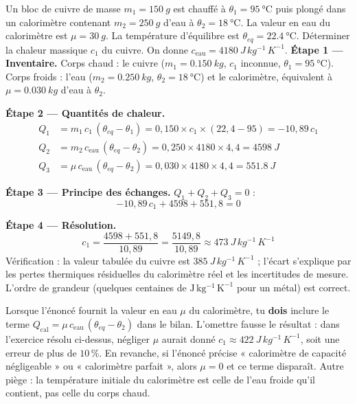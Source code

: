 \documentclass[11pt]{article}
\begin{document}
\begin{exoresolu}
Un bloc de cuivre de masse $m_1 = \SI{150}{g}$ est chauffé à $\theta_1 = \SI{95}{\celsius}$ puis plongé dans un calorimètre contenant $m_2 = \SI{250}{g}$ d'eau à $\theta_2 = \SI{18}{\celsius}$. La valeur en eau du calorimètre est $\mu = \SI{30}{g}$. La température d'équilibre est $\theta_{eq} = \SI{22,4}{\celsius}$. Déterminer la chaleur massique $c_1$ du cuivre. On donne $c_{\text{eau}} = \SI{4180}{J\,kg^{-1}\,K^{-1}}$.
\tcblower
\textbf{Étape 1 — Inventaire.} Corps chaud : le cuivre ($m_1 = \SI{0,150}{kg}$, $c_1$ inconnue, $\theta_1 = \SI{95}{\celsius}$). Corps froids : l'eau ($m_2 = \SI{0,250}{kg}$, $\theta_2 = \SI{18}{\celsius}$) et le calorimètre, équivalent à $\mu = \SI{0,030}{kg}$ d'eau à $\theta_2$.

\textbf{Étape 2 — Quantités de chaleur.}
\begin{align*}
Q_1 &= m_1\,c_1\,(\theta_{eq} - \theta_1) = 0,150 \times c_1 \times (22,4 - 95) = -10,89\,c_1 \\
Q_2 &= m_2\,c_{\text{eau}}\,(\theta_{eq} - \theta_2) = 0,250 \times 4180 \times 4,4 = \SI{4598}{J} \\
Q_3 &= \mu\,c_{\text{eau}}\,(\theta_{eq} - \theta_2) = 0,030 \times 4180 \times 4,4 = \SI{551,8}{J}
\end{align*}

\textbf{Étape 3 — Principe des échanges.} $Q_1 + Q_2 + Q_3 = 0$ :
\[ -10,89\,c_1 + 4598 + 551,8 = 0 \]

\textbf{Étape 4 — Résolution.}
\[ c_1 = \frac{4598 + 551,8}{10,89} = \frac{5149,8}{10,89} \approx \SI{473}{J\,kg^{-1}\,K^{-1}} \]
Vérification : la valeur tabulée du cuivre est $\SI{385}{J\,kg^{-1}\,K^{-1}}$ ; l'écart s'explique par les pertes thermiques résiduelles du calorimètre réel et les incertitudes de mesure. L'ordre de grandeur (quelques centaines de $\mathrm{J\,kg^{-1}\,K^{-1}}$ pour un métal) est correct.
\end{exoresolu}

\begin{attention}
Lorsque l'énoncé fournit la valeur en eau $\mu$ du calorimètre, tu \textbf{dois} inclure le terme $Q_{\text{cal}} = \mu\,c_{\text{eau}}\,(\theta_{eq} - \theta_2)$ dans le bilan. L'omettre fausse le résultat : dans l'exercice résolu ci-dessus, négliger $\mu$ aurait donné $c_1 \approx \SI{422}{J\,kg^{-1}\,K^{-1}}$, soit une erreur de plus de $10\,\%$. En revanche, si l'énoncé précise « calorimètre de capacité négligeable » ou « calorimètre parfait », alors $\mu = 0$ et ce terme disparaît. Autre piège : la température initiale du calorimètre est celle de l'eau froide qu'il contient, pas celle du corps chaud.
\end{attention}
\end{document}
